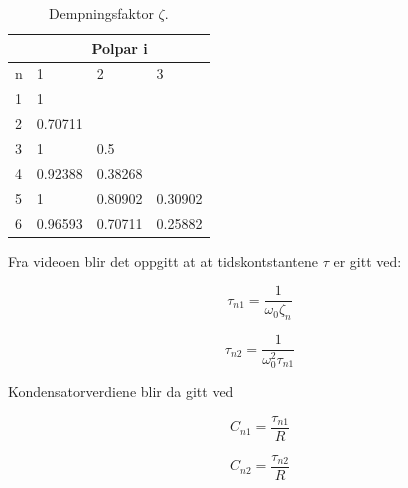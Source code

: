 \begin{table}[]
	\caption{Dempningsfaktor $\zeta$.}
	\centering
	\begin{tabular}{|l|lll|}
	\hline
	\multicolumn{1}{|c|}{} & \multicolumn{3}{c|}{Polpar i}                                         \\ \hline
	n                      & \multicolumn{1}{l|}{1}       & \multicolumn{1}{l|}{2}       & 3       \\ \hline
	1                      & \multicolumn{1}{l|}{1}       & \multicolumn{1}{l|}{}        &         \\ \hline
	2                      & \multicolumn{1}{l|}{0.70711} & \multicolumn{1}{l|}{}        &         \\ \hline
	3                      & \multicolumn{1}{l|}{1}       & \multicolumn{1}{l|}{0.5}     &         \\ \hline
	4                      & \multicolumn{1}{l|}{0.92388} & \multicolumn{1}{l|}{0.38268} &         \\ \hline
	5                      & \multicolumn{1}{l|}{1}       & \multicolumn{1}{l|}{0.80902} & 0.30902 \\ \hline
	6                      & \multicolumn{1}{l|}{0.96593} & \multicolumn{1}{l|}{0.70711} & 0.25882 \\ \hline
	\end{tabular}
	\label{tab:polpar}
	\end{table}

Fra videoen \cite{lundheim_2022_et} blir det oppgitt at at tidskontstantene $\tau$ er gitt ved:

\noindent\begin{minipage}{.5\linewidth}
	\begin{equation}
		\tau_{n1}=\frac{1}{\omega_0 \zeta_n} 
	\end{equation}
	\end{minipage}%
	\begin{minipage}{.5\linewidth}
	\begin{equation}
		\tau_{n2}=\frac{1}{\omega_0^2 \tau_{n1}}
	\end{equation}
	\label{eq:tau}
	\end{minipage}

Kondensatorverdiene blir da gitt ved

\noindent\begin{minipage}{.5\linewidth}
	\begin{equation}
		C_{n1}= \frac{\tau_{n1}}{R} 
	\end{equation}
	\end{minipage}%
	\begin{minipage}{.5\linewidth}
	\begin{equation}
		C_{n2}= \frac{\tau_{n2}}{R} 
	\end{equation}
	\label{eq:capacitor}
	\end{minipage}